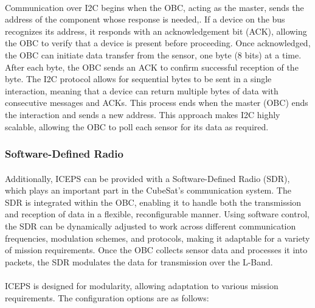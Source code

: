 \documentclass[11pt]{article}
\begin{document}
	\paragraph{}Communication over I2C begins when the OBC, acting as the master, sends the address of the component whose response is needed,. If a device on the bus recognizes its address, it responds with an acknowledgement bit (ACK), allowing the OBC to verify that a device is present before proceeding. Once acknowledged, the OBC can initiate data transfer from the sensor, one byte (8 bits) at a time. After each byte, the OBC sends an ACK to confirm successful reception of the byte. The I2C protocol allows for sequential bytes to be sent in a single interaction, meaning that a device can return multiple bytes of data with consecutive messages and ACKs. This process ends when the master (OBC) ends the interaction and sends a new address. This approach makes I2C highly scalable, allowing the OBC to poll each sensor for its data as required.
	
	\paragraph{}
	
	\subsubsection{Software-Defined Radio}
	
	\paragraph{} Additionally, ICEPS can be provided with a Software-Defined Radio (SDR), which plays an important part in the CubeSat's communication system. The SDR is integrated within the OBC, enabling it to handle both the transmission and reception of data in a flexible, reconfigurable manner. Using software control, the SDR can be dynamically adjusted to work across different communication frequencies, modulation schemes, and protocols, making it adaptable for a variety of mission requirements. Once the OBC collects sensor data and processes it into packets, the SDR modulates the data for transmission over the L-Band.
	
	\paragraph{} ICEPS is designed for modularity, allowing adaptation to various mission requirements. The configuration options are as follows:
	
\end{document}
